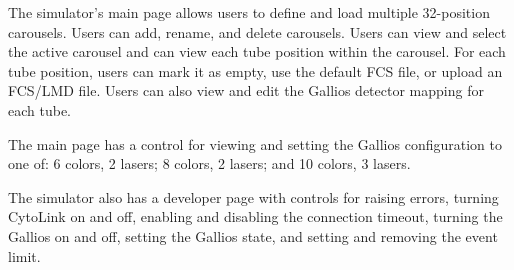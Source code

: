 \documentclass[letterpaper,11pt,twoside,final]{article}
\begin{document}
The simulator's main page allows users to define and load multiple
32-position carousels. Users can add, rename, and delete
carousels. Users can view and select the active carousel and can view
each tube position within the carousel. For each tube position, users
can mark it as empty, use the default FCS file, or upload an FCS/LMD
file. Users can also view and edit the Gallios detector mapping for
each tube.

The main page has a control for viewing and setting the Gallios
configuration to one of: 6 colors, 2 lasers; 8 colors, 2 lasers; and
10 colors, 3 lasers.

The simulator also has a developer page with controls for raising
errors, turning CytoLink on and off, enabling and disabling the
connection timeout, turning the Gallios on and off, setting the
Gallios state, and setting and removing the event limit.
\end{document}

